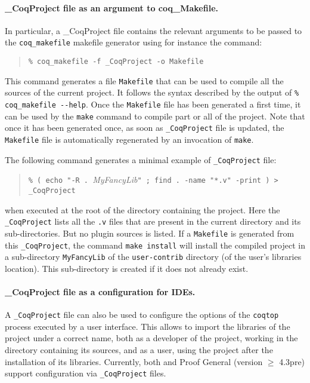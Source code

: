 \paragraph{\_CoqProject file as an argument to  coq\_Makefile.}
In particular, a \_CoqProject file contains the relevant
arguments to be passed to the \texttt{coq\_makefile} makefile
generator using for instance the command:

\begin{quotation}
\texttt{\% coq\_makefile -f \_CoqProject -o Makefile}
\end{quotation}

This command generates a file \texttt{Makefile} that can be used to
compile all the sources of the current project. It follows the
syntax described by the output of \texttt{\% coq\_makefile -{}-help}.
Once the \texttt{Makefile} file has been generated a first time, it
can be used by the \texttt{make} command to compile part or all of
the project. Note that once it has been generated once, as soon as
\texttt{\_CoqProject} file is updated, the \texttt{Makefile} file is
automatically regenerated by an invocation of \texttt{make}.

The following command generates a minimal example of
\texttt{\_CoqProject} file:
\begin{quotation}
\texttt{\% ( echo "-R .\ }\textit{MyFancyLib}\texttt{" ; find .\ -name
  "*.v" -print ) > \_CoqProject}
\end{quotation}
when executed at the root of the directory containing the
project. Here the \texttt{\_CoqProject} lists all the \texttt{.v} files
that are present in the current directory and its sub-directories. But no
plugin sources is listed. If a \texttt{Makefile} is generated from
this \texttt{\_CoqProject}, the command \texttt{make install} will
install the compiled project in a sub-directory \texttt{MyFancyLib} of
the \texttt{user-contrib} directory  (of the user's {\Coq} libraries
location). This sub-directory is created if it does not already exist.

\paragraph{\_CoqProject file as a configuration for IDEs.}

A \texttt{\_CoqProject} file can also be used to configure the options
of the \texttt{coqtop} process executed by a user interface. This
allows to import the libraries of the project under a correct name,
both as a developer of the project, working in the directory
containing its sources, and as a user, using the project after
the installation of its libraries. Currently, both \CoqIDE{} and Proof
General (version $\geq$ 4.3pre) support configuration via
\texttt{\_CoqProject} files.

